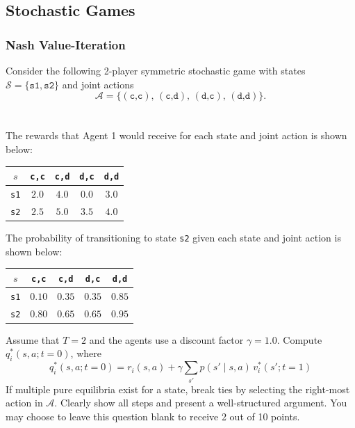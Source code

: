 \subsection{Stochastic Games}

\subsubsection{Nash Value-Iteration}

\points[10] Consider the following 2-player symmetric stochastic game with states $\mathcal{S} = \{\texttt{s1}, \texttt{s2}\}$ and
joint actions \[\mathcal{A}=\{(\texttt{c,c}),\,(\texttt{c,d}),\,(\texttt{d,c}),\,(\texttt{d,d})\}.\]
\\~\\
The rewards that Agent 1 would receive for each state and joint action is shown below:
\begin{table}[H]
  \centering
  \begin{tabular}{|c|c|c|c|c|}
    \hline
    $s$ & \texttt{c,c} & \texttt{c,d} & \texttt{d,c} & \texttt{d,d} \\\hline
    \texttt{s1} & $2.0$ & $4.0$ & $0.0$ & $3.0$ \\\hline
    \texttt{s2} & $2.5$ & $5.0$ & $3.5$ & $4.0$ \\\hline
  \end{tabular}
\end{table}
\noindent The probability of transitioning to state \texttt{s2} given each state and joint action is shown below:
\begin{table}[H]
  \centering
  \begin{tabular}{|c|c|c|c|c|}
    \hline
    $s$ & \texttt{c,c} & \texttt{c,d} & \texttt{d,c} & \texttt{d,d} \\\hline
    \texttt{s1} & $0.10$ & $0.35$ & $0.35$ & $0.85$ \\\hline
    \texttt{s2} & $0.80$ & $0.65$ & $0.65$ & $0.95$ \\\hline
  \end{tabular}
\end{table}
\noindent Assume that $T=2$ and the agents use a discount factor $\gamma=1.0$.
Compute $q_i^*(s,a;t=0)$, where
  \[q_i^*(s,a;t=0) = r_i(s,a)+\gamma\sum_{s'}p(s'\mid s,a)\,v_i^*(s';t=1)\]
If multiple pure equilibria exist for a state, break ties by selecting the right-most action in $\mathcal{A}$. Clearly show all steps and present a well-structured argument. You may choose to leave this question blank to receive 2 out of 10 points.

